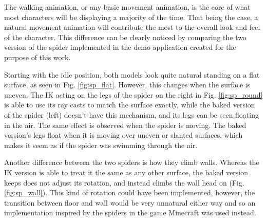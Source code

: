 The walking animation, or any basic movement animation, is the core of what
most characters will be displaying a majority of the time. That being the case,
a natural movement animation will contribute the most to the overall look and
feel of the character. This difference can be clearly noticed by comparing the
two version of the spider implemented in the demo application created for the
purpose of this work. 

Starting with the idle position, both models look quite natural standing on
a flat surface, as seen in Fig. \ref{fig:sp_flat}. However, this changes when
the surface is uneven. The IK acting on the legs of the spider on the right in
Fig. \ref{fig:sp_round} is able to use its ray casts to match the surface
exactly, while the baked version of the spider (left) doesn't have this
mechanism, and its legs can be seen floating in the air. The same effect is
observed when the spider is moving. The baked version's legs float when it is
moving over uneven or slanted surfaces, which makes it seem as if the spider was
swimming through the air. 

Another difference between the two spiders is how they climb walls. Whereas the
IK version is able to treat it the same as any other surface, the baked version
keeps does not adjust its rotation, and instead climbs the wall head on (Fig.
\ref{fig:sp_wall}). This kind of rotation could have been implemented, however,
the transition between floor and wall would be very unnatural either way and so
an implementation inspired by the spiders in the game Minecraft was used
instead.

